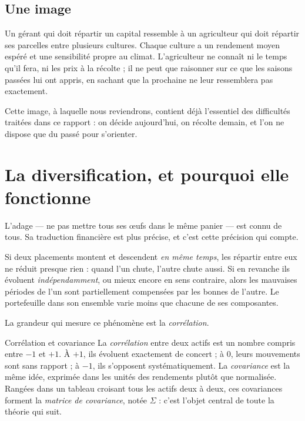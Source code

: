 \subsection{Une image}

Un gérant qui doit répartir un capital ressemble à un agriculteur qui doit
répartir ses parcelles entre plusieurs cultures. Chaque culture a un rendement
moyen espéré et une sensibilité propre au climat. L'agriculteur ne connaît ni le
temps qu'il fera, ni les prix à la récolte ; il ne peut que raisonner sur ce que
les saisons passées lui ont appris, en sachant que la prochaine ne leur
ressemblera pas exactement.

Cette image, à laquelle nous reviendrons, contient déjà l'essentiel des
difficultés traitées dans ce rapport : on décide aujourd'hui, on récolte demain,
et l'on ne dispose que du passé pour s'orienter.

\section{La diversification, et pourquoi elle fonctionne}

L'adage — ne pas mettre tous ses œufs dans le même panier — est connu de tous.
Sa traduction financière est plus précise, et c'est cette précision qui compte.

Si deux placements montent et descendent \emph{en même temps}, les répartir entre
eux ne réduit presque rien : quand l'un chute, l'autre chute aussi. Si en
revanche ils évoluent \emph{indépendamment}, ou mieux encore en sens contraire,
alors les mauvaises périodes de l'un sont partiellement compensées par les bonnes
de l'autre. Le portefeuille dans son ensemble varie moins que chacune de ses
composantes.

La grandeur qui mesure ce phénomène est la \emph{corrélation}.

\begin{definitionbox}{Corrélation et covariance}
La \emph{corrélation} entre deux actifs est un nombre compris entre $-1$ et
$+1$. À $+1$, ils évoluent exactement de concert ; à $0$, leurs mouvements sont
sans rapport ; à $-1$, ils s'opposent systématiquement. La \emph{covariance} est
la même idée, exprimée dans les unités des rendements plutôt que normalisée.
Rangées dans un tableau croisant tous les actifs deux à deux, ces covariances
forment la \emph{matrice de covariance}, notée $\Sigma$ : c'est l'objet
central de toute la théorie qui suit.
\end{definitionbox}

